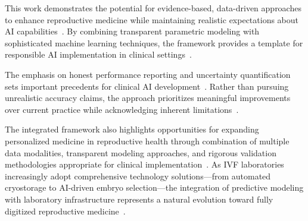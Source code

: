 This work demonstrates the potential for evidence-based, data-driven approaches to enhance reproductive medicine while maintaining realistic expectations about AI capabilities~\cite{topol2019high}. By combining transparent parametric modeling with sophisticated machine learning techniques, the framework provides a template for responsible AI implementation in clinical settings~\cite{rudin2019stop}.

The emphasis on honest performance reporting and uncertainty quantification sets important precedents for clinical AI development~\cite{varoquaux2022machine}. Rather than pursuing unrealistic accuracy claims, the approach prioritizes meaningful improvements over current practice while acknowledging inherent limitations~\cite{rajkomar2019machine}.

The integrated framework also highlights opportunities for expanding personalized medicine in reproductive health through combination of multiple data modalities, transparent modeling approaches, and rigorous validation methodologies appropriate for clinical implementation~\cite{li2020federated,topol2019high}. As IVF laboratories increasingly adopt comprehensive technology solutions—from automated cryostorage to AI-driven embryo selection—the integration of predictive modeling with laboratory infrastructure represents a natural evolution toward fully digitized reproductive medicine~\cite{go2023deep}. 